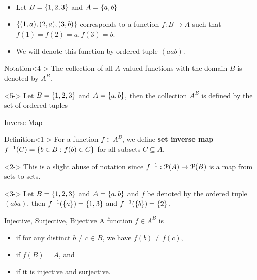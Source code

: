 \documentclass[12pt,aspectratio=169]{beamer}
\begin{document}
\begin{frame}
    \begin{example}
        \begin{itemize}
            \item Let $B = \left\{1,2,3\right\}$ and $A = \left\{a,b\right\}$ 
            \item <2->$\left\{(1,a), (2,a), (3,b)\right\}$ corresponds to a function $f:B \to A$ such that $f(1)= f(2) = a, f(3) =b$.
            \item<3-> We will denote this function by ordered tuple $(aab)$.
        \end{itemize}
    \end{example}
 
    \begin{block}{Notation}<4-> 
        The collection of all $A$-valued functions with the domain $B$ is denoted by $A^B$. 
    \end{block}
    
    \begin{example}<5->
        Let $B = \left\{1,2,3\right\}$ and $A = \left\{a,b\right\}$, then the collection $A^B$ is defined by the set of ordered tuples 
    \end{example}    
\end{frame}

\begin{frame}{Inverse Map}
    \begin{block}{Definition}<1->
        For a function $f \in A^B$, we define \textbf{set inverse map} $f^{-1}(C) = \left\{b \in B: f(b) \in C\right\}$ for all subsets $C \subseteq A$. 
    \end{block}
    \begin{rem}<2-> 
        This is a slight abuse of notation since $f^{-1}: \mathcal{P}(A) \to \mathcal{P}(B)$ is a map from sets to sets. 
    \end{rem}
    \begin{example}<3->
        Let $B = \left\{1,2,3\right\}$ and $A = \left\{a,b\right\}$ and $f$ be denoted by the ordered tuple $(aba)$, then $f^{-1}(\left\{a\right\}) = \left\{1,3\right\}$ and $f^{-1}(\left\{b\right\}) = \left\{2\right\}$.
    \end{example}
\end{frame}

\begin{frame}{Injective, Surjective, Bijective} 
    A function $f \in A^B$ is
    \begin{itemize}
        \item<1->[\textbf{injective:}] if for any distinct $b \neq c \in B$, we have $f(b) \neq f(c)$,
        \item<2->[\textbf{surjective:}] if $f(B) = A$, and 
        \item<3->[\textbf{bijective:}] if it is injective and surjective.  
    \end{itemize}
\end{frame}
\end{document}
